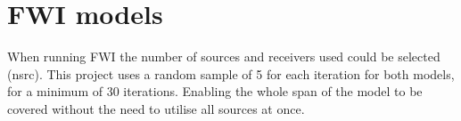 \section{FWI models}
When running FWI the number of sources and receivers used could be selected (nsrc). This project uses a random sample of 5 for each iteration for both models, for a minimum of 30 iterations. Enabling the whole span of the model to be covered without the need to utilise all sources at once. 